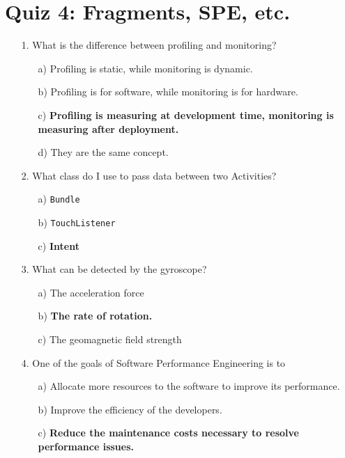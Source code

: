 \documentclass[12pt]{book}
\begin{document}
\section*{Quiz 4: Fragments, SPE, etc.}

\begin{itemize}
    \item[1.] What is the difference between profiling and monitoring?
    \begin{itemize}
        \item[a)] Profiling is static, while monitoring is dynamic.
        \item[b)] Profiling is for software, while monitoring is for hardware.
        \item[c)] \textbf{Profiling is measuring at development time, monitoring is measuring after deployment.}
        \item[d)] They are the same concept.
    \end{itemize}

    \item[2.] What class do I use to pass data between two Activities?
    \begin{itemize}
        \item[a)] \texttt{Bundle}
        \item[b)] \texttt{TouchListener}
        \item[c)] \textbf{Intent}
    \end{itemize}

    \item[3.] What can be detected by the gyroscope?
    \begin{itemize}
        \item[a)] The acceleration force
        \item[b)] \textbf{The rate of rotation.}
        \item[c)] The geomagnetic field strength
    \end{itemize}

    \item[4.] One of the goals of Software Performance Engineering is to
    \begin{itemize}
        \item[a)] Allocate more resources to the software to improve its performance.
        \item[b)] Improve the efficiency of the developers.
        \item[c)] \textbf{Reduce the maintenance costs necessary to resolve performance issues.}
    \end{itemize}


\end{itemize}
\end{document}
